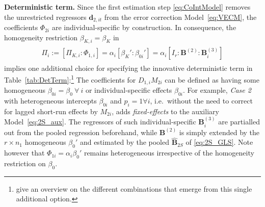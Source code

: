 \textbf{Deterministic term.} Since the first estimation step \eqref{eq:CoIntModel} removes the unrestricted regressors $ \boldsymbol{d}_{2,it} $ from the error correction Model~\eqref{eq:VECM}, the coefficients $ \Phi_{2i} $ are individual-specific by construction. In consequence, the homogeneity restriction $ \beta_{K,i} = \beta_K $ in 
\begin{align} \label{eq:2S_det}
\begin{split}
	\Pi_i := \left[ \Pi_{K,i} : \Phi_{1,i} \right] = \alpha_i \left[ \beta_{K}' : \beta_{0i}' \right] = \alpha_i \left[I_r^{\ } : \mathbf{B}_{\ }^{(2)} : \mathbf{B}_i^{(3)} \right]
\end{split}
\end{align}
implies one additional choice for specifying the innovative deterministic term in Table~\ref{tab:DetTerm}:\footnote{\citet[Ch.~4.1]{GroenFrank2003} give an overview on the different combinations that emerge from this single additional option.} 
The coefficients for $ D_{1,i} M_{2i} $ can be defined as having some homogeneous $ \beta_{0i} = \beta_{0} \ \forall \ i $ or individual-specific effects $ \beta_{0i} $. For example, \textit{Case 2} with heterogeneous intercepts $ \beta_{0i} $ and $ p_i = 1 \forall i $, i.e.~without the need to correct for lagged short-run effects by $ M_{2i} $, adds \textit{fixed-effects} to the auxiliary Model~\eqref{eq:2S_aux}. The regressors of such individual-specific $ \mathbf{B}_i^{(3)} $ are partialled out from the pooled regression beforehand, while $ \mathbf{B}^{(2)} $ is simply extended by the $ r \times n_1 $ homogeneous $ \beta_{0}' $ and estimated by the pooled $ \widehat{\mathbf{B}}_{2S} $ of \eqref{eq:2S_GLS}. Note however that $ \Phi_{1i} = \alpha_{i} \beta_{0}' $ remains heterogeneous irrespective of the homogeneity restriction on $ \beta_{0} $.


